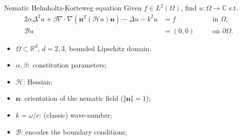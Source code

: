\documentclass[11pt,aspectratio=169,xcolor=dvipsnames]{beamer}
\begin{document}
\begin{frame}{Nematic Helmholtz-Korteweg equation\footnotemark}
  Given $f \in L^2(\Omega)$, find $u : \Omega \to \mathbb{C}$ s.t. 
  \begin{alignat*}{2}
    \alpha \Delta^2 u + \beta \nabla \cdot \nabla(\bm{n}^T (\mathcal{H} u) \bm{n}) - \Delta u - k^2 u &= f \quad &&\text{in } \Omega, \\
    \mathcal{B}u &= (0,0) \quad &&\text{on } \partial \Omega.
  \end{alignat*}
  \begin{itemize}
    \item $\Omega \subset \mathbb{R}^d$, $d = 2,3$, bounded Lipschitz domain;
    \item $\alpha, \beta:$ constitution parameters;
    \item $\mathcal{H}$: Hessian;
    \item $\bm{n}$: orientation of the nematic field ($\Vert \bm{n} \Vert = 1$);
    \item $k = \omega / c$: (classic) wave-number;
    \item $\mathcal{B}$: encodes the boundary conditions;
  \end{itemize}
  \begin{center}
  \end{center}
\end{frame}
\end{document}
